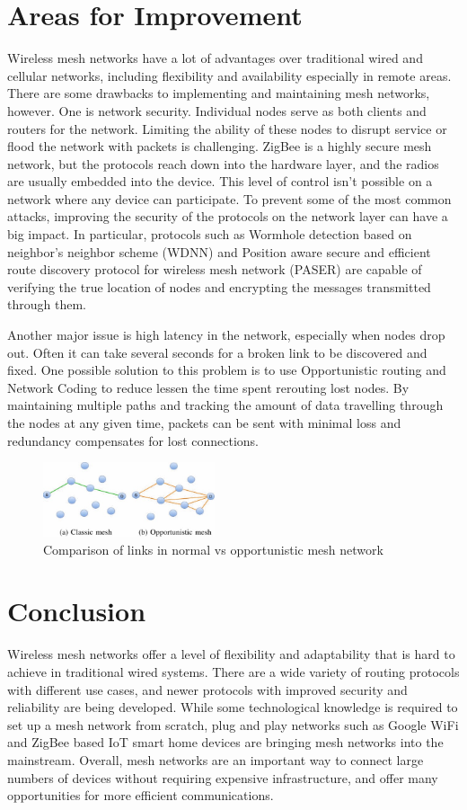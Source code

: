 \documentclass[conference]{IEEEtran}
\begin{document}
\section{Areas for Improvement}
Wireless mesh networks have a lot of advantages over traditional wired and cellular networks, including flexibility and availability especially in remote areas.  There are some drawbacks to implementing and maintaining mesh networks, however. One is network security. Individual nodes serve as both clients and routers for the network. Limiting the ability of these nodes to disrupt service or
flood the network with packets is challenging.  ZigBee is a highly secure mesh network, but the protocols reach down into the hardware layer, and the radios are usually embedded into the device.  This level of control isn't possible on a network where any device can participate. To prevent some of the most common attacks, improving the security of the protocols on the network layer 
can have a big impact. In particular, protocols such as Wormhole detection based on neighbor's neighbor scheme (WDNN) and Position aware secure and efficient route discovery protocol for wireless mesh network (PASER) are capable of verifying the true location of nodes and encrypting the messages transmitted through them\cite{7454499}.

Another major issue is high latency in the network, especially when nodes drop out. Often it can take several seconds for a broken link to be discovered and fixed. One possible solution to this problem is to use Opportunistic routing and Network Coding to reduce lessen the time spent rerouting lost nodes\cite{8319326}. 
\newpage
By maintaining multiple paths and tracking the amount of data travelling through the nodes
at any given time, packets can be sent with minimal loss and redundancy compensates for lost connections.
\begin{figure}[h]
    \centering
    \includegraphics[width=0.45\textwidth]{opportunistic.jpg}
    \caption{Comparison of links in normal vs opportunistic mesh network}
\end{figure}
\section{Conclusion}
Wireless mesh networks offer a level of flexibility and adaptability that is hard to achieve in traditional wired systems. There are a wide variety of routing protocols with different use cases, and newer protocols with improved security and reliability are being developed. While some technological knowledge is required to set up a mesh network from scratch, plug and play networks such as Google WiFi 
and ZigBee based IoT smart home devices are bringing mesh networks into the mainstream. Overall, mesh networks are an important way to connect large numbers of devices without requiring expensive infrastructure, and offer many opportunities for more efficient communications.
\newpage
\printbibliography
\end{document}
